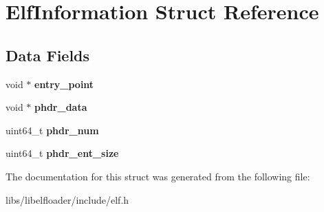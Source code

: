 \hypertarget{structElfInformation}{}\section{Elf\+Information Struct Reference}
\label{structElfInformation}
\subsection*{Data Fields}
\begin{DoxyCompactItemize}
\item 
void $\ast$ {\bfseries entry\+\_\+point}\hypertarget{structElfInformation_a2148229b696d730cbf79c544d516b481}{}\label{structElfInformation_a2148229b696d730cbf79c544d516b481}

\item 
void $\ast$ {\bfseries phdr\+\_\+data}\hypertarget{structElfInformation_ae1087d44824eb8688683711be533c217}{}\label{structElfInformation_ae1087d44824eb8688683711be533c217}

\item 
uint64\+\_\+t {\bfseries phdr\+\_\+num}\hypertarget{structElfInformation_a6177dfe160e92f14bff48004d70285d9}{}\label{structElfInformation_a6177dfe160e92f14bff48004d70285d9}

\item 
uint64\+\_\+t {\bfseries phdr\+\_\+ent\+\_\+size}\hypertarget{structElfInformation_a49a079d44134ae72785ecd2243bd5916}{}\label{structElfInformation_a49a079d44134ae72785ecd2243bd5916}

\end{DoxyCompactItemize}


The documentation for this struct was generated from the following file\+:\begin{DoxyCompactItemize}
\item 
libs/libelfloader/include/elf.\+h\end{DoxyCompactItemize}

